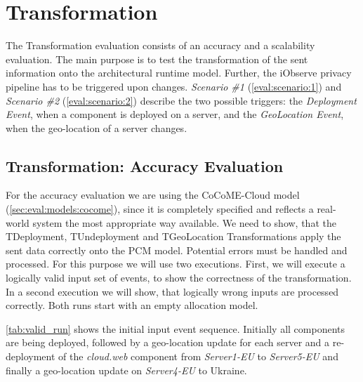 \section{Transformation}
\label{sec:Evaluation:monitoring}

The Transformation evaluation consists of an accuracy and a scalability evaluation. The main purpose is to test the transformation of the sent information onto the architectural runtime model. Further, the iObserve privacy pipeline has to be triggered upon changes. \textit{Scenario \#1} (\autoref{eval:scenario:1}) and \textit{Scenario \#2} (\autoref{eval:scenario:2}) describe the two possible triggers: the \textit{Deployment Event}, when a component is deployed on a server, and the \textit{GeoLocation Event}, when the geo-location of a server changes. 

\subsection{Transformation: Accuracy Evaluation}

For the accuracy evaluation we are using the CoCoME-Cloud model (\autoref{sec:eval:models:cocome}), since it is completely specified and reflects a real-world system the most appropriate way available. We need to show, that the TDeployment, TUndeployment and TGeoLocation Transformations apply the sent data correctly onto the PCM model. Potential errors must be handled and processed. For this purpose we will use two executions. First, we will execute a logically valid input set of events, to show the correctness of the transformation. In a second execution we will show, that logically wrong inputs are processed correctly. Both runs start with an empty allocation model.

\autoref{tab:valid_run} shows the initial input event sequence. Initially all components are being deployed, followed by a geo-location update for each server and a re-deployment of the \textit{cloud.web} component from \textit{Server1-EU} to \textit{Server5-EU} and finally a geo-location update on \textit{Server4-EU} to Ukraine.

